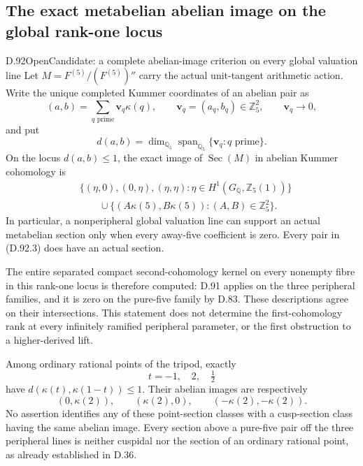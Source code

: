 \subsection{The exact metabelian abelian image on the global rank-one locus}

\begin{statement}{D.92}{Open}{Candidate: a complete abelian-image criterion on every global valuation line}
Let \(M=F^{(5)}/(F^{(5)})''\) carry the actual unit-tangent
arithmetic action. Write the unique completed Kummer coordinates
of an abelian pair as
\[
 (a,b)=\sum_{q\text{ prime}}\mathbf v_q\kappa(q),
 \qquad \mathbf v_q=(a_q,b_q)\in\mathbb Z_5^2,
 \qquad \mathbf v_q\longrightarrow0,
                                                               \tag{D.92.1}
\]
and put
\[
 d(a,b)=\dim_{\mathbb Q_5}
       \operatorname{span}_{\mathbb Q_5}\{\mathbf v_q:q\text{ prime}\}.
                                                               \tag{D.92.2}
\]
On the locus \(d(a,b)\le1\), the exact image of
\(\operatorname{Sec}(M)\) in abelian Kummer cohomology is
\[
 \begin{aligned}
 &\{(\eta,0),(0,\eta),(\eta,\eta):
          \eta\in H^1(G_{\mathbb Q},\mathbb Z_5(1))\}\\
 &\qquad{}\cup
 \{(A\kappa(5),B\kappa(5)):(A,B)\in\mathbb Z_5^2\}.
 \end{aligned}                                                \tag{D.92.3}
\]
In particular, a nonperipheral global valuation line can
support an actual metabelian section only when every
away-five coefficient is zero. Every pair in (D.92.3)
does have an actual section.

The entire separated compact second-cohomology kernel on
every nonempty fibre in this rank-one locus is therefore
computed: D.91 applies on the three peripheral families,
and it is zero on the pure-five family by D.83. These
descriptions agree on their intersections. This statement
does not determine the first-cohomology rank at every
infinitely ramified peripheral parameter, or the first
obstruction to a higher-derived lift.

Among ordinary rational points of the tripod, exactly
\[
                         t=-1,\quad 2,\quad \tfrac12
                                                               \tag{D.92.4}
\]
have \(d(\kappa(t),\kappa(1-t))\le1\). Their abelian
images are respectively
\[
       (0,\kappa(2)),\qquad(\kappa(2),0),\qquad
                         (-\kappa(2),-\kappa(2)).
                                                               \tag{D.92.5}
\]
No assertion identifies any of these point-section classes
with a cusp-section class having the same abelian image.
Every section above a pure-five pair off the three
peripheral lines is neither cuspidal nor the section of
an ordinary rational point, as already established in D.36.
\end{statement}

